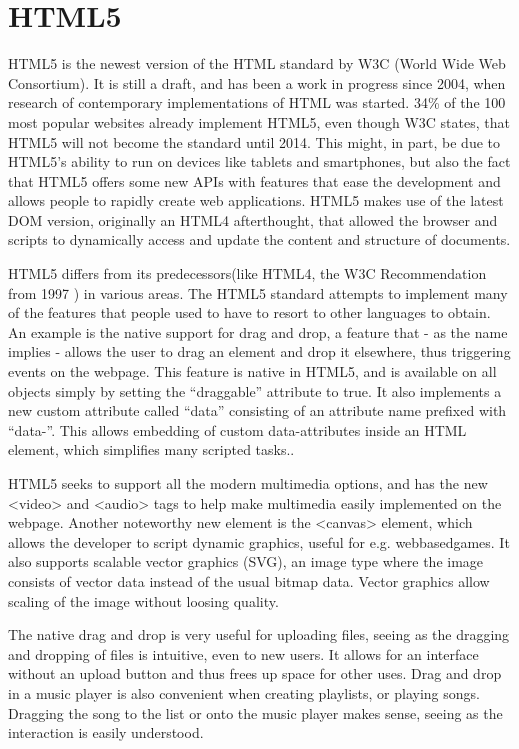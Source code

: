 \section{HTML5}
HTML5 is the newest version of the HTML standard by W3C (World Wide Web
Consortium). It is still a draft, and has been a work in progress since 2004, 
when research of contemporary implementations of HTML was started. 
34\% of the 100 most popular websites already implement HTML5\cite{Maine11}, 
even though W3C states, that HTML5 will not become the standard until 2014.\cite{W3C11} This might, in part, 
be due to HTML5's ability to run on devices like tablets and smartphones, 
but also the fact that HTML5 offers some new APIs with features that ease the
development and allows people to rapidly create web applications.
HTML5 makes use of the latest DOM version, originally an HTML4
afterthought, that allowed the browser and scripts to dynamically access and
update the content and structure of documents\cite{Hegaret05}.


HTML5 differs from its predecessors(like HTML4, the W3C Recommendation from 1997 \cite{Kesteren11}) in various areas. 
The HTML5 standard attempts to implement many of the features that people used
to have to resort to other languages to obtain.
An example is the native support for drag and drop, a feature that - as the name
implies - allows the user to drag an element and drop it elsewhere, thus
triggering events on the webpage.
This feature is native in HTML5, and is available on all objects simply by setting the ``draggable'' attribute to true. 
It also implements a new custom attribute called ``data'' 
consisting of an attribute name prefixed with ``data-''. This allows embedding
of custom data-attributes inside an HTML element, which simplifies many
scripted tasks.\cite{Bewick10}.


HTML5 seeks to support all the modern multimedia options, 
and has the new <video> and <audio> tags to help make multimedia easily implemented on the webpage. 
Another noteworthy new element is the <canvas> element, 
which allows the developer to script dynamic graphics, useful for e.g.
webbasedgames. 
It also supports scalable vector graphics (SVG), an image type where the image
consists of vector data instead of the usual bitmap data. Vector graphics allow
scaling of the image without loosing quality.


The native drag and drop is very useful for uploading files, 
seeing as the dragging and dropping of files is intuitive, even to new users.
It allows for an interface without an upload button and thus frees up space for other uses. 
Drag and drop in a music player is also convenient when creating playlists, or
playing songs.
Dragging the song to the list or onto the music player makes sense, seeing as the interaction is easily understood. 
